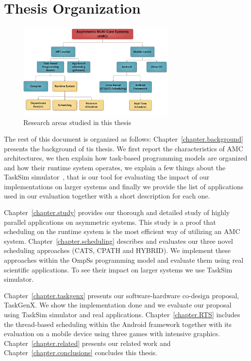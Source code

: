\section{Thesis Organization}
\begin{figure}[t]%
	\centering
	\includegraphics[width=0.7\textwidth]{figures/research_areas.pdf}
	\caption{Research areas studied in this thesis}
	\label{fig:research_areas}
\end{figure}
The rest of this document is organized as follows: 
Chapter~\ref{chapter.background} presents the background of tis thesis.
We first report the characteristics of AMC architectures, we then explain how task-based programming models are organized and how their runtime system operates, we explain a few things about the TaskSim simulator~\cite{AbstrLevels_TACO12}, that is our tool for evaluating the impact of our implementations on larger systems and finally we provide the list of applications used in our evaluation together with a short description for each one.

Chapter~\ref{chapter.study} provides our thorough and detailed study of highly parallel applications on asymmetric systems.
This study is a proof that scheduling on the runtime system is the most efficient way of utilizing an AMC system.
Chapter~\ref{chapter.scheduling} describes and evaluates our three novel scheduling approaches (CATS, CPATH and HYBRID). 
We implement these approaches within the OmpSs programming model and evaluate them using real scientific applications.
To see their impact on larger systems we use TaskSim simulator.

Chapter~\ref{chapter.taskgenx} presents our software-hardware co-design proposal, TaskGenX.
We show the implementation done and we evaluate our proposal using TaskSim simulator and real applications.
Chapter~\ref{chapter.RTS} includes the thread-based scheduling within the Android framework together with its evaluation on a mobile device using three games with intensive graphics.
Chapter~\ref{chapter.related} presents our related work and Chapter~\ref{chapter.conclusions} concludes this thesis.

